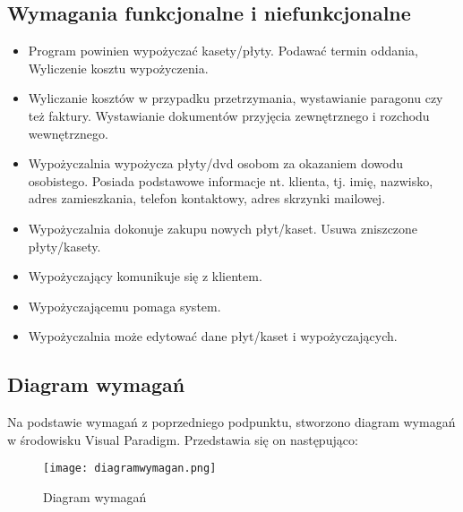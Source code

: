 \documentclass{article}
\begin{document}
\subsection{Wymagania funkcjonalne i niefunkcjonalne}
\begin{itemize}
\item Program powinien wypożyczać kasety/płyty. Podawać termin oddania, Wyliczenie kosztu wypożyczenia. 
\item Wyliczanie kosztów w przypadku przetrzymania, wystawianie paragonu czy też faktury. Wystawianie dokumentów przyjęcia zewnętrznego i rozchodu wewnętrznego.
\item Wypożyczalnia wypożycza płyty/dvd osobom za okazaniem dowodu osobistego. Posiada podstawowe informacje nt. klienta, tj. imię, nazwisko, adres zamieszkania, telefon kontaktowy, adres skrzynki mailowej.
\item Wypożyczalnia dokonuje zakupu nowych płyt/kaset. Usuwa zniszczone płyty/kasety. 
\item Wypożyczający komunikuje się z klientem. 
\item Wypożyczającemu pomaga system.
\item Wypożyczalnia może edytować dane płyt/kaset i wypożyczających.
\end{itemize}

\subsection{Diagram wymagań}
Na podstawie wymagań z poprzedniego podpunktu, stworzono diagram wymagań w środowisku Visual Paradigm. Przedstawia się on następująco:
\begin{figure}[!ht]
\centering
	\texttt{[image: diagramwymagan.png]}
	\caption{Diagram wymagań}
	\label{fig:obrazek 1}
	\end{figure}
\end{document}
